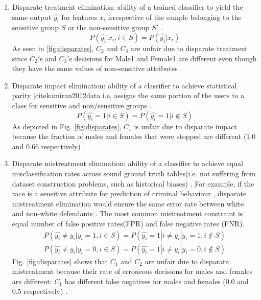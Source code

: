 \documentclass[runningheads]{llncs}
\begin{document}
\begin{enumerate}
\item Disparate treatment elimination: ability of a trained classifier to yield the same output $\hat{y_i}$ for features $x_i$ irrespective of the sample belonging to the sensitive group $S$ or the non-sensitive group $S'$ \cite{krasanakis2018adaptive}.
\begin{equation}
P(\hat{y_i}|x_i, i \in S) = P(\hat{y_i}|x_i)
\label{eq:disparatetreatment}
\end{equation}
As seen in \ref{fig:disparates}, $C_2$ and $C_3$ are unfair due to disparate treatment since $C_2'$s and $C_3'$s decisions for Male1 and Female1 are different even though they have the same values of non-sensitive attributes \cite{zafar2017fairness}.
\item Disparate impact elimination: ability of a classifier to achieve statistical parity |cite{kamiran2012data} \cite{kamiran2010discrimination} \cite{kamishima2012fairness} i.e, assigns the same portion of the users to a class for sensitive and non/sensitive groups \cite{krasanakis2018adaptive}.
\begin{equation}
P(\hat{y_i} = 1|i \in S) = P(\hat{y_i} = 1|i \notin S)
\label{eq:disparateimpact}
\end{equation}
As depicted in Fig. \ref{fig:disparates}, $C_1$ is unfair due to disparate impact because the fraction of males and females that were stopped are different (1.0 and 0.66 respectively) \cite{zafar2017fairness}.
\item Disparate mistreatment elimination: ability of a classifier to achieve equal misclassification rates across sound ground truth tables(i.e. not suffering from dataset construction problems, such as historical biases) \cite{zafar2015fairness} \cite{zafar2017fairness} \cite{krasanakis2018adaptive}. For example, if the race is a sensitive attribute for prediction of criminal behaviour \cite{compasdataset}, disparate mistreatment elimination would ensure the same error rate between white and non-white defendants \cite{krasanakis2018adaptive}. The most common mistreatment constraint is equal number of false positive rates(FPR) and false negative rates (FNR).
\begin{equation}
\begin{split}
P(\hat{y_i} \neq y_i | y_i = 1,i \in S) = P(\hat{y_i} = 1|i \neq y_i | y_i = 1,i \notin S) \\
P(\hat{y_i} \neq y_i | y_i = 0,i \in S) = P(\hat{y_i} = 1|i \neq y_i | y_i = 0,i \notin S)
\label{eq:disparateimpact}
\end{split}
\end{equation}
Fig. \ref{fig:disparates} shows that $C_1$ and $C_2$ are unfair due to disparate mistreatment because their rate of erroneous decisions for males and females are different: $C_1$ has different false negatives for males and females (0.0 and 0.5 respectively) \cite{zafar2017fairness}.
\end{enumerate}
\end{document}
